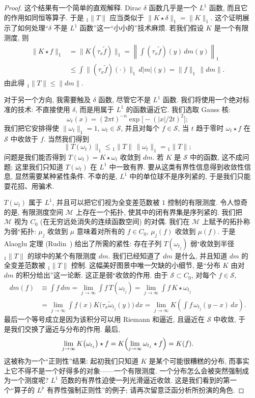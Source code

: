 \begin{proof}
这个结果有一个简单的直观解释. Dirac $\delta$ 函数几乎是一个 $L^1$ 函数, 而且它的作用如同恒等算子. 于是 ${}_1\|T\|$ 应当类似于 $\|K\star\delta\|_1=\|K\|_1$. 这个证明展示了如何处理``$\delta$ 不是 $L^1$ 函数''这一``小小的''技术麻烦. 若我们假设 $K$ 是一个有限测度, 则
\begin{align*}
\|K\star f\|_1&=\|K(\tau_x\tilde{f})\|_1
=\left\|\int(\tau_x\tilde{f})(y)\,dm(y)\right\|_1 \\
&\leq\int\|(\tau_x\tilde{f})(\cdot)\|_1\,d|m|(y)=\|f\|_1\,\|dm\|.
\end{align*}
由此得 ${}_1\|T\|\leq\|dm\|$.

对于另一个方向, 我需要触及 $\delta$ 函数, 尽管它不是 $L^1$ 函数. 我们将使用一个绝对标准的技术: 不直接使用 $\delta$, 而是用属于 $L^1$ 的函数逼近它. 我们选取 Gauss 核:
\[
\omega_t(x)=(2\pi t)^{-n}\exp\bigl[-(|x|/2t)^2\bigr];
\]
我们把它安排得使 $\|\omega_t\|_1=1$, $\omega_t\in\mathcal{S}$, 并且对每个 $f\in\mathcal{S}$, 当 $t$ 趋于零时 $\omega_t\star f$ 在 $\mathcal{S}$ 中收敛于 $f$. 当然我们得到
\[
\|T(\omega_t)\|_1\leq{}_1\|T\|\,\|\omega_t\|_1={}_1\|T\|;
\]
问题是我们能否得到 $T(\omega_t)=K\star\omega_t$ 收敛到 $dm$. 若 $K$ 是 $\mathcal{S}$ 中的函数, 这不成问题; 这里我们只知道 $T(\omega_t)$ 在 $L^1$ 中一致有界. 要从这类有界性信息得到收敛性信息, 显然需要某种紧性条件. 不幸的是, $L^1$ 中的单位球不是序列紧的, 于是我们只能耍花招、用骗术.

$T(\omega_t)$ 属于 $L^1$, 并且可以把它们视为全变差范数被 $1$ 控制的有限测度. 令人惊奇的是, 有限测度空间 $\mathcal{M}$ 上存在一个拓扑, 使其中的闭有界集是序列紧的. 我们把 $\mathcal{M}$ 视为 $C_0$ (在无穷远处消失的连续函数空间) 的对偶. 我们在 $\mathcal{M}$ 上赋予的拓扑称为弱$^\star$拓扑: $\mu_j$ 收敛到 $\mu$ 意味着对所有的 $f\in C_0$, $\mu_j(f)$ 收敛到 $\mu(f)$. 于是 Alaoglu 定理 (Rudin~\cite{rudinfa}) 给出了所需的紧性: 存在子列 $T(\omega_{t_j})$ 弱$^\star$收敛到半径 ${}_1\|T\|$ 的球中的某个有限测度 $dm$. 我们已经知道了 $dm$ 是什么, 并且知道 $dm$ 的全变差范数被 ${}_1\|T\|$ 控制. 这幅美好图景中唯一欠缺的小细节, 是``分布 $K$ 由对 $dm$ 的积分给出''这一论断. 这正是弱$^\star$收敛的作用. 由于 $\mathcal{S}\subset C_0$, 对每个 $f\in\mathcal{S}$,
\begin{align*}
dm(f)&\equiv\int f\,dm=\lim_{j\to\infty}\int f\,T(\omega_{t_j})
=\lim_{j\to\infty}\int f\,K\star\omega_{t_j} \\
&=\lim_{j\to\infty}\int f(x)K\bigl(\tau_x\tilde{\omega}_{t_j}(y)\bigr)\,dx
=\lim_{j\to\infty}K\left(\int f\,\omega_{t_j}(y-x)\,dx\right).
\end{align*}
最后一个等号成立是因为该积分可以用 Riemann 和逼近, 且逼近在 $\mathcal{S}$ 中收敛, 于是我们交换了逼近与分布的作用. 最后,
\[
\lim_{j\to\infty}K\bigl(\omega_{t_j}\bigr)\star f=K\Bigl(\lim_{j\to\infty}\omega_{t_j}\star f\Bigr)=K(f).
\]
这被称为一个``正则性''结果: 起初我们只知道 $K$ 是某个可能很糟糕的分布, 而事实上它不得不是一个好得多的对象——一个有限测度. 一个分布怎么会被突然强制成为一个测度呢? $L^1$ 范数的有界性迫使一列光滑逼近收敛. 这是我们看到的第一个``算子的 $L^p$ 有界性强制正则性''的例子; 请再次留意泛函分析所扮演的角色.
\end{proof}

